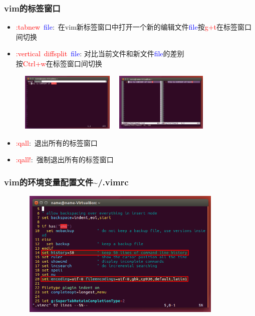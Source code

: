 \frame
{
	\frametitle{\textrm{vim}的标签窗口}
	\begin{itemize}
		\item \textcolor{red}{:tabnew}~\textcolor{blue}{file}:~在\textrm{vim}新标签窗口中打开一个新的编辑文件\textcolor{blue}{file}按\textcolor{red}{g+t}在标签窗口间切换
		\item \textcolor{red}{:vertical~diffsplit}~\textcolor{blue}{file}: 对比当前文件和新文件\textcolor{blue}{file}的差别\\
			按\textcolor{red}{Ctrl+w}在标签窗口间切换
	\end{itemize}
\begin{figure}[h!]
\centering
\hspace*{-5.5pt}
\includegraphics[height=1.1in,width=1.8in,viewport=0 0 700 450,clip]{Figures/vim-tabnew.png}
\includegraphics[height=1.1in,width=2.0in,viewport=0 0 730 460,clip]{Figures/vim-diff.png}
\label{vim-command-switch}
\end{figure}
	\begin{itemize}
\item \textcolor{red}{:qall}:~退出所有的标签窗口
\item \textcolor{red}{:qall!}:~强制退出所有的标签窗口
	\end{itemize}
}

\frame
{
	\frametitle{\textrm{vim}的环境变量配置文件\textrm{\textasciitilde/.vimrc}}
\begin{figure}[h!]
\centering
\hspace*{-5.5pt}
\includegraphics[height=2.4in,width=4.0in,viewport=0 0 700 450,clip]{Figures/vim-vimrc.png}
\label{vim-vimrc}
\end{figure}
}

